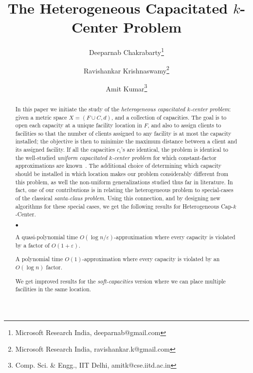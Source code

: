 \documentclass{llncs}
\def\mckc{{\sffamily Heterogeneous Cap-$k$-Center}\xspace}
\renewcommand{\epsilon}{\varepsilon}
\newcommand{\initOneLiners}{%
    \setlength{\itemsep}{0pt}
    \setlength{\parsep }{0pt}
    \setlength{\topsep }{0pt}
%
}
\newenvironment{oneLiners}[1][\ensuremath{\bullet}]
    {\begin{list}
        {#1}
        {\initOneLiners}}
    {\end{list}}
\begin{document}
\title{\huge The Heterogeneous Capacitated $k$-Center Problem}
\date{}
\author{Deeparnab Chakrabarty\thanks{Microsoft Research India, deeparnab@gmail.com} \and Ravishankar Krishnaswamy\thanks{Microsoft Research India, ravishankar.k@gmail.com} \and Amit Kumar\thanks{Comp. Sci. \& Engg., IIT Delhi, amitk@cse.iitd.ac.in}}
\institute{}
\maketitle
\begin{abstract}
	In this paper we initiate the study of the {\em heterogeneous capacitated $k$-center problem}: given a metric space $X = (F \cup C, d)$, and a collection of capacities. The goal is to open each capacity at a unique facility location in $F$, and also to assign clients to facilities so that the number of clients assigned to any facility is at most the capacity installed; the objective is then to minimize the maximum distance between a client and its assigned facility. If all the capacities $c_i$'s are identical, the problem is identical to the well-studied {\em uniform capacitated $k$-center problem} for which constant-factor approximations are known~\cite{Bar-IlanKP93,KhullerS00}.
The additional choice of determining which capacity should be installed in which location makes our problem considerably different from this problem, as well the non-uniform generalizations studied thus far in literature. In fact, one of our contributions is in relating the heterogeneous problem to special-cases of the classical {\em santa-claus problem}. Using this connection, and by designing new algorithms for these special cases, we get the following results for \mckc.
\begin{oneLiners}
\item A quasi-polynomial time $O(\log n/\epsilon)$-approximation where every capacity is violated by a factor of $O(1+\epsilon)$.
\item A polynomial time $O(1)$-approximation where every capacity is violated by an $O(\log n)$ factor.
\end{oneLiners}
We get improved results for the {\em soft-capacities} version where we can place multiple facilities in the same location.
\end{abstract}


\end{document}
